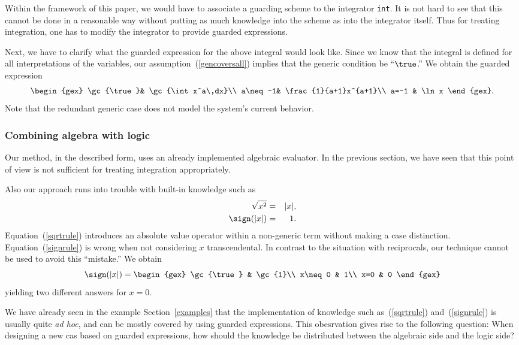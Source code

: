 Within the framework of this paper, we would have to associate a
guarding scheme to the integrator {\tt int}. It is not hard to see
that this cannot be done in a reasonable way without putting as much
knowledge into the scheme as into the integrator itself. Thus for
treating integration, one has to modify the integrator to provide
guarded expressions.

Next, we have to clarify what the guarded expression for the above
integral would look like. Since we know that the integral is defined
for all interpretations of the variables, our
assumption~(\ref{gencoversall}) implies that the generic condition be
``$\true$.'' We obtain the guarded expression
$$
\begin{gex}
\gc{\true}& \gc{\int x^a\,dx}\\
a\neq-1& \frac{1}{a+1}x^{a+1}\\
a=-1 & \ln x
\end{gex}.
$$
Note that the redundant generic case does not model the system's
current behavior.
%
\subsubsection{Combining algebra with logic}
Our method, in the described form, uses an already implemented
algebraic evaluator. In the previous section, we have seen that this
point of view is not sufficient for treating integration
appropriately.

Also our approach runs into trouble with built-in knowledge such as
\begin{eqnarray}
\sqrt{x^2}&=&|x|\label{sqrtrule},\\
\sign(|x|)&=&1\label{signrule}.
\end{eqnarray}
Equation~(\ref{sqrtrule}) introduces an absolute value operator within
a non-generic term without making a case distinction.
Equation~(\ref{signrule}) is wrong when not considering $x$
transcendental. In contrast to the situation with reciprocals, our
technique cannot be used to avoid this ``mistake.'' We obtain
$$
\sign(|x|)=\begin{gex}
\gc{\true} & \gc{1}\\
x\neq0 & 1\\
x=0 & 0
	   \end{gex}
$$
yielding two different answers for $x=0$.

We have already seen in the example Section~\ref{examples} that the
implementation of knowledge such as~(\ref{sqrtrule})
and~(\ref{signrule}) is usually quite {\it ad hoc}, and can be mostly
covered by using guarded expressions. This obesrvation gives rise to
the following question: When designing a new {\sc cas} based on guarded
expressions, how should the knowledge be distributed between the
algebraic side and the logic side?
%
